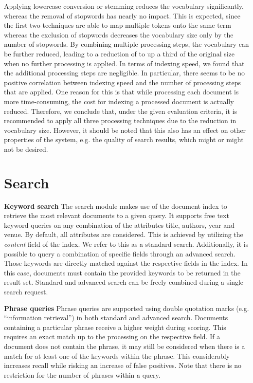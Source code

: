 \documentclass{sig-alternate-05-2015}
\begin{document}
Applying lowercase conversion or stemming reduces the vocabulary significantly, whereas the removal of stopwords has nearly no impact. This is expected, since the first two techniques are able to map multiple tokens onto the same term whereas the exclusion of stopwords decreases the vocabulary size only by the number of stopwords. By combining multiple processing steps, the vocabulary can be further reduced, leading to a reduction of to up a third of the original size when no further processing is applied. In terms of indexing speed, we found that the additional processing steps are negligible. In particular, there seems to be no positive correlation between indexing speed and the number of processing steps that are applied. One reason for this is that while processing each document is more time-consuming, the cost for indexing a processed document is actually reduced. Therefore, we conclude that, under the given evaluation criteria, it is recommended to apply all three processing techniques due to the reduction in vocabulary size. However, it should be noted that this also has an effect on other properties of the system, e.g. the quality of search results, which might or might not be desired.

\section{Search}

\textbf{Keyword search} \quad The search module makes use of the document index to retrieve the most relevant documents to a given query. It supports free text keyword queries on any combination of the attributes title, authors, year and venue. By default, all attributes are considered. This is achieved by utilizing the \emph{content} field of the index. We refer to this as a standard search. Additionally, it is possible to query a combination of specific fields through an advanced search. Those keywords are directly matched against the respective fields in the index. In this case, documents must contain the provided keywords to be returned in the result set. Standard and advanced search can be freely combined during a single search request.

\textbf{Phrase queries} \quad Phrase queries are supported using double quotation marks (e.g. ``information retrieval'') in both standard and advanced search. Documents containing a particular phrase receive a higher weight during scoring. This requires an exact match up to the processing on the respective field. If a document does not contain the phrase, it may still be considered when there is a match for at least one of the keywords within the phrase. This considerably increases recall while risking an increase of false positives. Note that there is no restriction for the number of phrases within a query.
\end{document}
